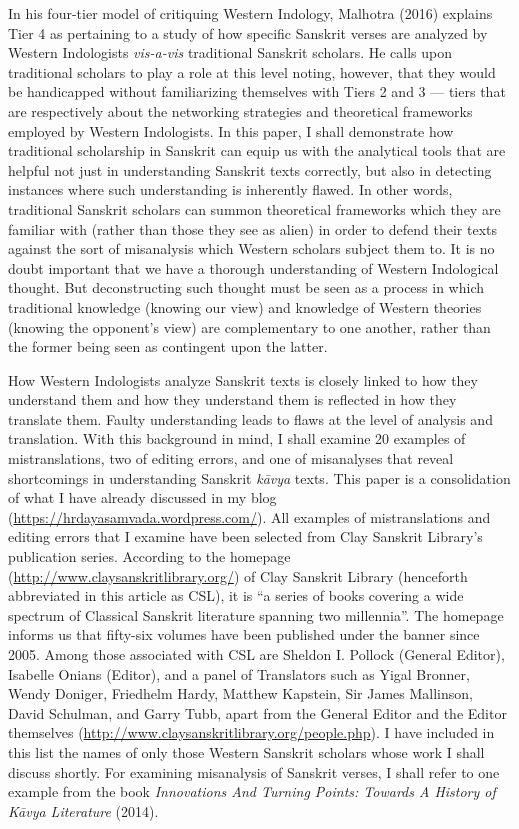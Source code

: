 In his four-tier model of critiquing Western Indology, Malhotra (2016) explains Tier 4 as pertaining to a study of how specific Sanskrit verses are analyzed by Western Indologists \textsl{vis-a-vis} traditional Sanskrit scholars. He calls upon traditional scholars to play a role at this level noting, however, that they would be handicapped without familiarizing themselves with Tiers 2 and 3 --- tiers that are respectively about the networking strategies and theoretical frameworks employed by Western Indologists. In this paper, I shall demonstrate how traditional scholarship in Sanskrit can equip us with the analytical tools that are helpful not just in understanding Sanskrit texts correctly, but also in detecting instances where such understanding is inherently flawed. In other words, traditional Sanskrit scholars can summon theoretical frameworks which they are familiar with (rather than those they see as alien) in order to defend their texts against the sort of misanalysis which Western scholars subject them to. It is no doubt important that we have a thorough understanding of Western Indological thought. But deconstructing such thought must be seen as a process in which traditional knowledge (knowing our view) and knowledge of Western theories (knowing the opponent’s view) are complementary to one another, rather than the former being seen as contingent upon the latter. 

How Western Indologists analyze Sanskrit texts is closely linked to how they understand them and how they understand them is reflected in how they translate them. Faulty understanding leads to flaws at the level of analysis and translation. With this background in mind, I shall examine 20 examples of mistranslations, two of editing errors, and one of misanalyses that reveal shortcomings in understanding Sanskrit \textsl{kāvya} texts. This paper is a consolidation of what I have already discussed in my blog (\url{https://hrdayasamvada.wordpress.com/}). All examples of mistranslations and editing errors that I examine have been selected from Clay Sanskrit Library's publication series. According to the homepage (\url{http://www.claysanskritlibrary.org/}) of Clay Sanskrit Library (henceforth abbreviated in this article as CSL), it is “a series of books covering a wide spectrum of Classical Sanskrit literature spanning two millennia”. The homepage informs us that fifty-six volumes have been published under the banner since 2005. Among those associated with CSL are Sheldon I. Pollock (General Editor), Isabelle Onians (Editor), and a panel of Translators such as Yigal Bronner, Wendy Doniger, Friedhelm Hardy, Matthew Kapstein, Sir James Mallinson, David Schulman, and Garry Tubb, apart from the General Editor and the Editor themselves (\url{http://www.claysanskritlibrary.org/people.php}). I have included in this list the names of only those Western Sanskrit scholars whose work I shall discuss shortly. For examining misanalysis of Sanskrit verses, I shall refer to one example from the book \textsl{Innovations And Turning Points: Towards A History of Kāvya Literature} (2014).\\[-21pt]

